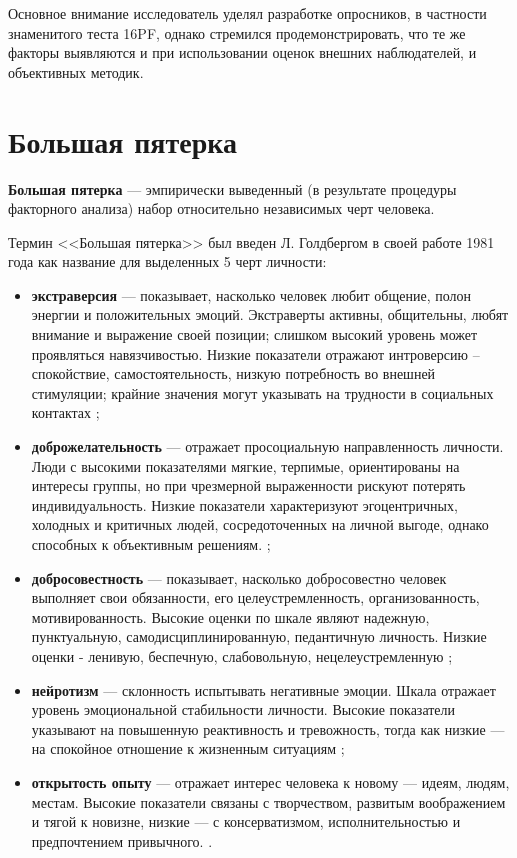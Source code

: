 Основное внимание исследователь уделял разработке опросников, в частности знаменитого теста 16PF, однако стремился продемонстрировать, что те же факторы выявляются и при использовании оценок внешних наблюдателей, и объективных методик.

\section{Большая пятерка}

\textbf{Большая пятерка} --- эмпирически выведенный (в результате процедуры факторного анализа) набор относительно независимых черт человека\cite{big_five_traits}. 

Термин <<Большая пятерка>> был введен  Л. Голдбергом в своей работе 1981 года \cite{goldberg1981language} как название для выделенных 5 черт личности:

\begin{itemize}
	\item \textbf{экстраверсия} --- показывает, насколько человек любит общение, полон энергии и положительных эмоций. Экстраверты активны, общительны, любят внимание и выражение своей позиции; слишком высокий уровень может проявляться навязчивостью. Низкие показатели отражают интроверсию -- спокойствие, самостоятельность, низкую потребность во внешней стимуляции; крайние значения могут указывать на трудности в социальных контактах \cite{big_five_traits};
	
	\item \textbf{доброжелательность} --- отражает просоциальную направленность личности. Люди с высокими показателями мягкие, терпимые, ориентированы на интересы группы, но при чрезмерной выраженности рискуют потерять индивидуальность. Низкие показатели характеризуют эгоцентричных, холодных и критичных людей, сосредоточенных на личной выгоде, однако способных к объективным решениям. \cite{radyuk2016bigfive};
	
	\item \textbf{добросовестность} --- показывает, насколько добросовестно человек выполняет свои обязанности, его целеустремленность, организованность, мотивированность. Высокие оценки по шкале являют надежную, пунктуальную, самодисциплинированную, педантичную личность. Низкие оценки - ленивую, беспечную, слабовольную, нецелеустремленную \cite{big_five_traits};
	
	\item \textbf{нейротизм} --- склонность испытывать негативные эмоции. Шкала отражает уровень эмоциональной стабильности личности. Высокие показатели указывают на повышенную реактивность и тревожность, тогда как низкие — на спокойное отношение к жизненным ситуациям \cite{big_five_traits};
	
	\item \textbf{открытость опыту} --- отражает интерес человека к новому — идеям, людям, местам. Высокие показатели связаны с творчеством, развитым воображением и тягой к новизне, низкие --- с консерватизмом, исполнительностью и предпочтением привычного. \cite{big_five_traits}.
\end{itemize}

